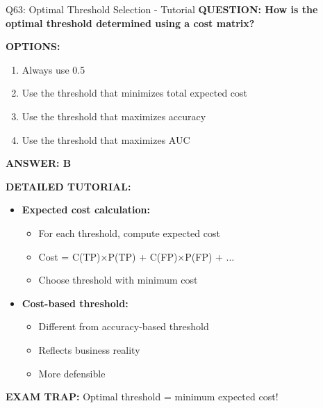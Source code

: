 \documentclass[8pt]{beamer}
\begin{document}
	\begin{frame}{Q63: Optimal Threshold Selection - Tutorial}
		\fontsize{6.5}{7.5}\selectfont
		\textbf{QUESTION: How is the optimal threshold determined using a cost matrix?}
		
		\vspace{0.1cm}
		\textbf{OPTIONS:}
		\begin{enumerate}
			\item Always use 0.5
			\item Use the threshold that minimizes total expected cost
			\item Use the threshold that maximizes accuracy
			\item Use the threshold that maximizes AUC
		\end{enumerate}
		
		\vspace{0.1cm}
		\textcolor{myblue}{\textbf{ANSWER: B}}
		
		\vspace{0.1cm}
		\textbf{DETAILED TUTORIAL:}
		\begin{itemize}
			\item \textbf{Expected cost calculation:}
			\begin{itemize}
				\item For each threshold, compute expected cost
				\item Cost = C(TP)×P(TP) + C(FP)×P(FP) + ...
				\item Choose threshold with minimum cost
			\end{itemize}
			\item \textbf{Cost-based threshold:}
			\begin{itemize}
				\item Different from accuracy-based threshold
				\item Reflects business reality
				\item More defensible
			\end{itemize}
		\end{itemize}
		
		\textcolor{myred}{\textbf{EXAM TRAP:}} Optimal threshold = \textcolor{myblue}{minimum expected cost}!
	\end{frame}
	
\end{document}
